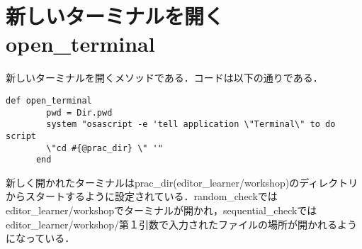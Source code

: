     \section{新しいターミナルを開くopen\_terminal}\label{ux65b0ux3057ux3044ux30bfux30fcux30dfux30caux30ebux3092ux958bux304fopen_terminal}

新しいターミナルを開くメソッドである．コードは以下の通りである．
\begin{screen}
{\small
\begin{verbatim}
def open_terminal
        pwd = Dir.pwd
        system "osascript -e 'tell application \"Terminal\" to do script 
        \"cd #{@prac_dir} \" '"
      end
\end{verbatim}}
\end{screen}

新しく開かれたターミナルはprac\_dir(editor\_learner/workshop)のディレクトリからスタートするように設定されている．random\_checkではeditor\_learner/workshopでターミナルが開かれ，sequential\_checkではeditor\_learner/workshop/第１引数で入力されたファイルの場所が開かれるようになっている．

    